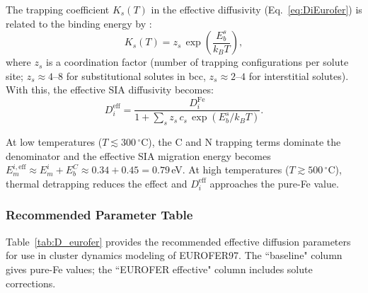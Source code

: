 \documentclass[pdflatex,sn-basic]{sn-jnl} %
\begin{document}
The trapping coefficient $K_s(T)$ in the effective diffusivity
(Eq.~\ref{eq:DiEurofer}) is related to the binding energy by \citep{Dudarev2008}:
\begin{equation}\label{eq:Ks}
    K_s(T) = z_s\,\exp\!\left(\frac{E_b^s}{k_BT}\right),
\end{equation}
where $z_s$ is a coordination factor (number of trapping configurations per
solute site; $z_s \approx 4$--$8$ for substitutional solutes in bcc,
$z_s \approx 2$--$4$ for interstitial solutes). With this, the effective
SIA diffusivity becomes:
\begin{equation}\label{eq:Deff_explicit}
    D_i^{\mathrm{eff}} = \frac{D_i^{\mathrm{Fe}}}{1 + \displaystyle\sum_s z_s\,c_s\,\exp(E_b^s/k_BT)}.
\end{equation}

At low temperatures ($T \lesssim 300\,^\circ$C), the C and N trapping terms
dominate the denominator and the effective SIA migration energy becomes
$E_m^{i,\mathrm{eff}} \approx E_m^i + E_b^C \approx 0.34 + 0.45 = 0.79$\,eV.
At high temperatures ($T \gtrsim 500\,^\circ$C), thermal detrapping reduces the
effect and $D_i^{\mathrm{eff}}$ approaches the pure-Fe value.


\subsubsection{Recommended Parameter Table}

Table~\ref{tab:D_eurofer} provides the recommended effective diffusion
parameters for use in cluster dynamics modeling of EUROFER97. The ``baseline"
column gives pure-Fe values; the ``EUROFER effective" column includes solute
corrections.
\end{document}
